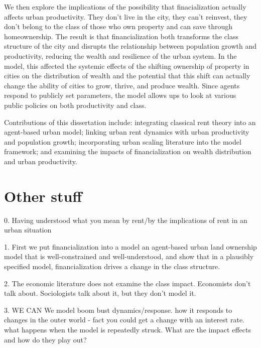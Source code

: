 We then explore the implications of the possibility that finacialization actually affects urban productivity. They don't live in the city, they can't reinvest, they don't belong to the class of those who own property and can save through homeownership. 
The result is that financialization both transforms the class structure of the city and disrupts the relationship between population growth and productivity, reducing the wealth and resilience of the urban system. In the model, this affected the systemic effects of the shifting ownership of property in cities on the distribution of wealth and the potential that this shift can actually change the ability of cities to grow, thrive, and produce wealth. 
Since agents respond to publicly set parameters, the model allows ups to look at various public policies on both productivity and class. 

Contributions of this dissertation include: integrating classical rent theory into an agent-based urban model; linking urban rent dynamics with urban productivity and population growth; incorporating urban scaling literature into the model framework; and examining the impacts of financialization on wealth distribution and urban productivity.


\section{Other stuff}


0. Having understood what you mean by rent/by the implications of rent in an urban situation

1. First we put financialization into a model an agent-based urban land ownership model that is well-constrained and well-understood, and show that in a plausibly specified model, financialization drives a change in the class structure. 

2. The economic literature does not examine the class impact. Economists don't talk about. Sociologists talk about it, but they don't model it.

3. WE CAN We model boom bust dynamics/response. how it responds to changes in the outer world - fact you could get a change with an interest rate. what happens when the model is repeatedly struck. What are the impact effects and how do they play out?

